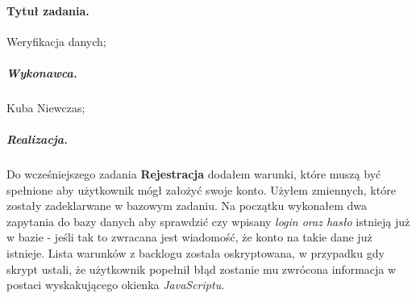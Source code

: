 \documentclass[a4paper]{article}
\begin{document}
	\paragraph{Tytuł zadania.} Weryfikacja danych;
	\subparagraph{Wykonawca.} Kuba Niewczas;
	\subparagraph{Realizacja.} Do wcześniejszego zadania \textbf{Rejestracja} dodałem warunki, które muszą być spełnione aby użytkownik mógł założyć swoje konto. Użyłem zmiennych, które zostały zadeklarwane w bazowym zadaniu. Na początku wykonałem dwa zapytania do bazy danych aby sprawdzić czy wpisany \emph{login oraz hasło} istnieją już w bazie - jeśli tak to zwracana jest wiadomość, że konto na takie dane już istnieje. Lista warunków z backlogu została oskryptowana, w przypadku gdy skrypt ustali, że użytkownik popełnił błąd zostanie mu zwrócona informacja w postaci wyskakującego okienka \emph{JavaScriptu}.
	
\end{document}
